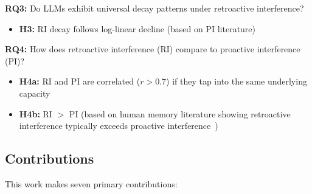 \documentclass{article}
\begin{document}
\textbf{RQ3:} Do LLMs exhibit universal decay patterns under retroactive interference?
\begin{itemize}[itemsep=2pt,topsep=3pt,parsep=0pt]
    \item \textbf{H3:} RI decay follows log-linear decline (based on PI literature)
\end{itemize}
\vspace{-3pt}

\textbf{RQ4:} How does retroactive interference (RI) compare to proactive interference (PI)?
\begin{itemize}[itemsep=2pt,topsep=3pt,parsep=0pt]
    \item \textbf{H4a:} RI and PI are correlated ($r > 0.7$) if they tap into the same underlying capacity
    \item \textbf{H4b:} RI $>$ PI (based on human memory literature showing retroactive interference typically exceeds proactive interference~\citep{jenkins1924obliviscence, underwood1957interference})
\end{itemize}

\subsection{Contributions}

This work makes seven primary contributions:
\end{document}
